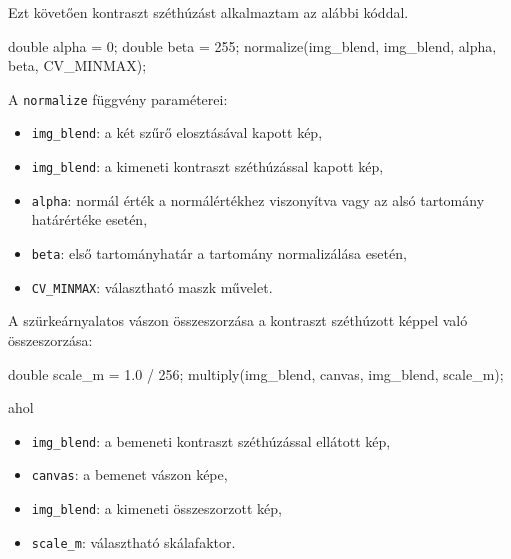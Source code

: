Ezt követően kontraszt széthúzást alkalmaztam az alábbi kóddal.
\begin{cpp}
double alpha = 0;
double beta = 255;
normalize(img_blend, img_blend, alpha, beta, CV_MINMAX);
\end{cpp}
A \texttt{normalize} függvény paraméterei:
\begin{itemize}
    \item \texttt{img\_blend}: a két szűrő elosztásával kapott kép,
    \item \texttt{img\_blend}: a kimeneti kontraszt széthúzással kapott kép,
    \item \texttt{alpha}: normál érték a normálértékhez viszonyítva vagy az alsó tartomány határértéke esetén,
    \item \texttt{beta}: első tartományhatár a tartomány normalizálása esetén,
    \item \texttt{CV\_MINMAX}: választható maszk művelet.
\end{itemize}
A szürkeárnyalatos vászon összeszorzása a kontraszt széthúzott képpel való összeszorzása:
\begin{cpp}
double scale_m = 1.0 / 256;
multiply(img_blend, canvas, img_blend, scale_m);
\end{cpp}
ahol
\begin{itemize}
    \item \texttt{img\_blend}: a bemeneti kontraszt széthúzással ellátott kép,
    \item \texttt{canvas}: a bemenet vászon képe,
    \item \texttt{img\_blend}: a kimeneti összeszorzott kép,
    \item \texttt{scale\_m}: választható skálafaktor.
\end{itemize}


